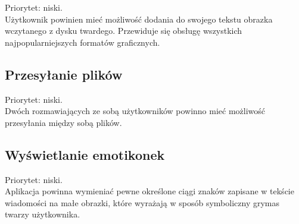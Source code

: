 \documentclass[a4paper,12pt]{article}
\begin{document}
Priorytet: niski.\\

Użytkownik powinien mieć możliwość dodania do swojego tekstu obrazka wczytanego z dysku twardego.
Przewiduje się obsługę wszystkich najpopularniejszych formatów graficznych.
\subsection[Przesyłanie plików]{Przesyłanie plików}

Priorytet: niski.\\

Dwóch rozmawiających ze sobą użytkowników powinno mieć możliwość przesyłania między sobą plików.
\subsection[Wyświetlanie emotikonek]{Wyświetlanie emotikonek}

Priorytet: niski.\\

Aplikacja powinna wymieniać pewne określone ciągi znaków zapisane w tekście wiadomości na małe obrazki, które
wyrażają w sposób symboliczny grymas twarzy użytkownika.
\end{document}

